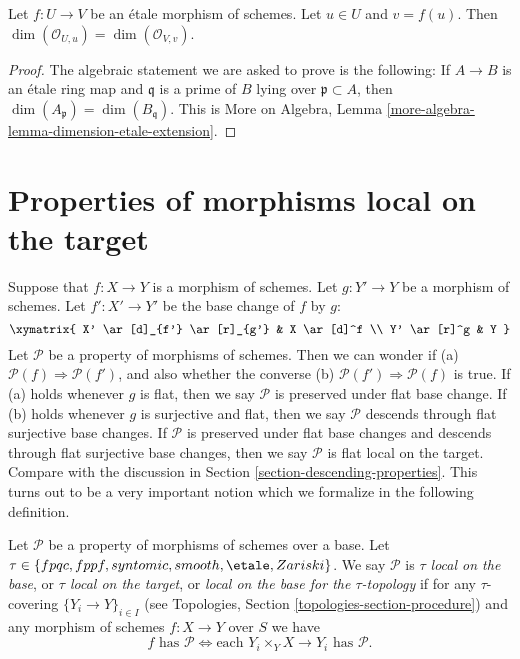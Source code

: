 \begin{lemma}
\label{lemma-dimension-local-ring-local}
Let $f : U \to V$ be an \'etale morphism of schemes.
Let $u \in U$ and $v = f(u)$. Then
$\dim(\mathcal{O}_{U, u}) = \dim(\mathcal{O}_{V, v})$.
\end{lemma}

\begin{proof}
The algebraic statement we are asked to prove is the following:
If $A \to B$ is an \'etale ring map and $\mathfrak q$ is a prime of
$B$ lying over $\mathfrak p \subset A$, then
$\dim(A_{\mathfrak p}) = \dim(B_{\mathfrak q})$.
This is
More on Algebra, Lemma \ref{more-algebra-lemma-dimension-etale-extension}.
\end{proof}








\section{Properties of morphisms local on the target}
\label{section-descending-properties-morphisms}

\noindent
Suppose that $f : X \to Y$ is a morphism of schemes.
Let $g : Y' \to Y$ be a morphism of schemes.
Let $f' : X' \to Y'$ be the base change of $f$ by $g$:
$$
\xymatrix{
X' \ar[d]_{f'} \ar[r]_{g'} & X \ar[d]^f \\
Y' \ar[r]^g & Y
}
$$
Let $\mathcal{P}$ be a property of morphisms of schemes.
Then we can wonder if (a) $\mathcal{P}(f) \Rightarrow \mathcal{P}(f')$,
and also whether the converse (b) $\mathcal{P}(f') \Rightarrow \mathcal{P}(f)$
is true. If (a) holds whenever $g$ is flat, then we say $\mathcal{P}$
is preserved under flat base change. If (b) holds whenever $g$ is
surjective and flat, then we say $\mathcal{P}$ descends through
flat surjective base changes. If $\mathcal{P}$ is preserved under
flat base changes and descends through flat surjective base changes,
then we say $\mathcal{P}$ is flat local on the target.
Compare with the discussion in
Section \ref{section-descending-properties}.
This turns out to be a very important notion which
we formalize in the following definition.

\begin{definition}
\label{definition-property-morphisms-local}
Let $\mathcal{P}$ be a property of morphisms of schemes over a base.
Let $\tau \in \{fpqc, fppf, syntomic, smooth, \etale, Zariski\}$.
We say $\mathcal{P}$ is {\it $\tau$ local on the base}, or
{\it $\tau$ local on the target}, or
{\it local on the base for the $\tau$-topology} if for any
$\tau$-covering $\{Y_i \to Y\}_{i \in I}$ (see
Topologies, Section \ref{topologies-section-procedure})
and any morphism of schemes $f : X \to Y$ over $S$ we
have
$$
f \text{ has }\mathcal{P}
\Leftrightarrow
\text{each }Y_i \times_Y X \to Y_i\text{ has }\mathcal{P}.
$$
\end{definition}

